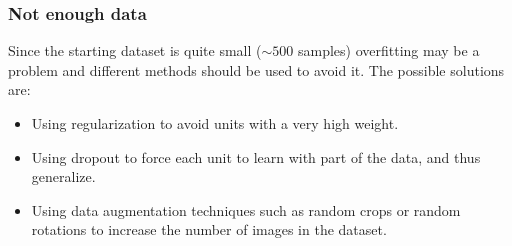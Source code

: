 \subsubsection{Not enough data}

Since the starting dataset is quite small (\( \sim 500 \) samples) overfitting may be a problem
and different methods should be used to avoid it. The possible solutions are:
\begin{itemize}
  \item Using regularization to avoid units with a very high weight.
  \item Using dropout to force each unit to learn with part of the data, and thus generalize.
  \item Using data augmentation techniques such as random crops or random rotations to increase
  the number of images in the dataset.
\end{itemize}
